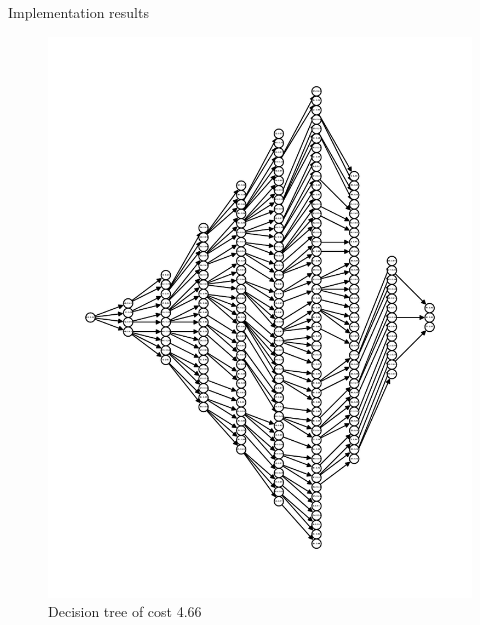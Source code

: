 \begin{frame}[allowframebreaks]{Implementation results}
\begin{figure}[htp]
{\begin{minipage}[t]{0.49\textwidth}
            \includegraphics[width=\textwidth]{figures/computed/dt_200.pdf}
            \caption{Decision tree of cost 4.66}
        \end{minipage}
        }
    \end{figure}
\end{frame}


